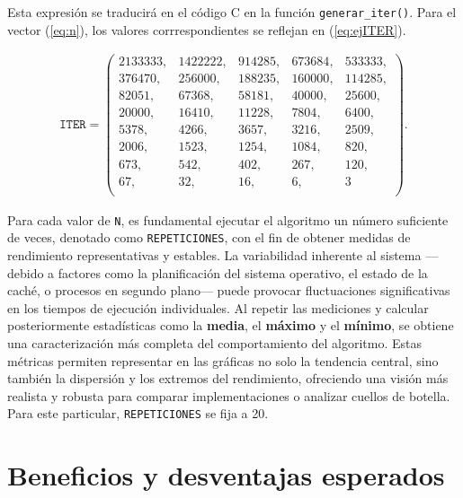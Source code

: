 \documentclass[11pt,a4paper,twoside]{article}
\theoremstyle{definition}
\begin{document}
	Esta expresión se traducirá en el código C en la función \texttt{generar\_iter()}. Para el vector (\ref{eq:n}), los valores corrrespondientes se reflejan en (\ref{eq:ejITER}).
	
	\begin{equation} \label{eq:ejITER}
		\begin{aligned}
			\texttt{ITER} = \left(
			\begin{matrix}
				2133333, & 1422222, & 914285, & 673684, & 533333, \\
				376470, & 256000, & 188235, & 160000, & 114285, \\
				82051, & 67368, & 58181, & 40000, & 25600, \\
				20000, & 16410, & 11228, & 7804, & 6400, \\
				5378, & 4266, & 3657, & 3216, & 2509, \\
				2006, & 1523, & 1254, & 1084, & 820, \\
				673, & 542, & 402, & 267, & 120, \\
				67, & 32, & 16, & 6, & 3 \\
			\end{matrix}
			\right).
		\end{aligned}
	\end{equation}

	Para cada valor de \texttt{N}, es fundamental ejecutar el algoritmo un número suficiente de veces, denotado como \texttt{REPETICIONES}, con el fin de obtener medidas de rendimiento representativas y estables. La variabilidad inherente al sistema ---debido a factores como la planificación del sistema operativo, el estado de la caché, o procesos en segundo plano--- puede provocar fluctuaciones significativas en los tiempos de ejecución individuales. Al repetir las mediciones y calcular posteriormente estadísticas como la \textbf{media}, el \textbf{máximo} y el \textbf{mínimo}, se obtiene una caracterización más completa del comportamiento del algoritmo. Estas métricas permiten representar en las gráficas no solo la tendencia central, sino también la dispersión y los extremos del rendimiento, ofreciendo una visión más realista y robusta para comparar implementaciones o analizar cuellos de botella. Para este particular, \texttt{REPETICIONES} se fija a 20.
		
	
	\section{Beneficios y desventajas esperados}
	
\end{document}

